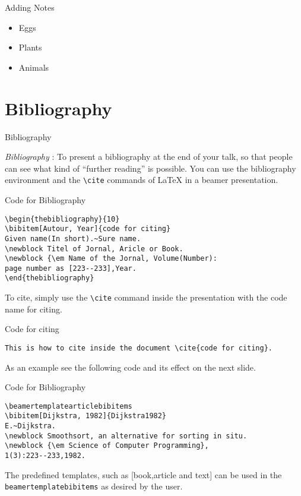 \documentclass[10pt,xcolor=x11names]{beamer}
\begin{document}
\begin{frame}{Adding Notes}
    \begin{itemize}
      \item<1-> Eggs
      \item<2-> Plants
      \item<3-> Animals
\end{itemize}
\end{frame}


\section{Bibliography}
\begin{frame}{Bibliography} \vspace{-5pt}

\emph{Bibliography} : To present a bibliography at the end of your talk, so that people can see what kind of “further reading” is possible. You can use the \alert{bibliography environment} and the \verb|\cite| commands of \alert{{\LaTeX}} in a beamer presentation.

\begin{exampleblock}{Code for Bibliography}
	\begin{verbatim}
\begin{thebibliography}{10}
\bibitem[Autour, Year]{code for citing}
Given name(In short).~Sure name.
\newblock Titel of Jornal, Aricle or Book.
\newblock {\em Name of the Jornal, Volume(Number):
page number as [223--233],Year.
\end{thebibliography}
	\end{verbatim}
\end{exampleblock}

To cite, simply use the \verb|\cite| command inside the presentation with the code name for citing.

\begin{exampleblock}{Code for citing}
	\begin{verbatim}
This is how to cite inside the document	\cite{code for citing}.
	\end{verbatim}
\end{exampleblock}

\vspace{100pt}

As an example see the following code and its effect on the next slide.

\begin{exampleblock}{Code for Bibliography}
	\begin{verbatim}
\beamertemplatearticlebibitems
\bibitem[Dijkstra, 1982]{Dijkstra1982}
E.~Dijkstra.
\newblock Smoothsort, an alternative for sorting in situ.
\newblock {\em Science of Computer Programming},
1(3):223--233,1982.
	\end{verbatim}
\end{exampleblock} \vspace{10pt}

The predefined templates, such as [book,article and text] can be used in the \verb|beamertemplatebibitems| as desired by the user. 
\end{frame}
\end{document}
